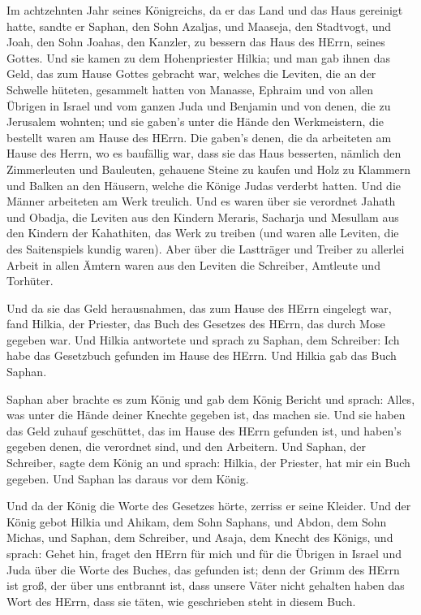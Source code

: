  Im achtzehnten Jahr seines Königreichs, da er das Land und
das Haus gereinigt hatte, sandte er Saphan, den Sohn Azaljas, und
Maaseja, den Stadtvogt, und Joah, den Sohn Joahas, den Kanzler, zu
bessern das Haus des HErrn, seines Gottes.  Und sie kamen zu
dem Hohenpriester Hilkia; und man gab ihnen das Geld, das zum Hause
Gottes gebracht war, welches die Leviten, die an der Schwelle hüteten,
gesammelt hatten von Manasse, Ephraim und von allen Übrigen in Israel
und vom ganzen Juda und Benjamin und von denen, die zu Jerusalem
wohnten;  und sie gaben's unter die Hände den Werkmeistern,
die bestellt waren am Hause des HErrn. Die gaben's denen, die da
arbeiteten am Hause des Herrn, wo es baufällig war, dass sie das Haus
besserten,  nämlich den Zimmerleuten und Bauleuten,
gehauene Steine zu kaufen und Holz zu Klammern und Balken an den
Häusern, welche die Könige Judas verderbt hatten.  Und die
Männer arbeiteten am Werk treulich. Und es waren über sie verordnet
Jahath und Obadja, die Leviten aus den Kindern Meraris, Sacharja und
Mesullam aus den Kindern der Kahathiten, das Werk zu treiben (und waren
alle Leviten, die des Saitenspiels kundig waren).  Aber
über die Lastträger und Treiber zu allerlei Arbeit in allen Ämtern waren
aus den Leviten die Schreiber, Amtleute und Torhüter.

 Und da sie das Geld herausnahmen, das zum Hause des HErrn
eingelegt war, fand Hilkia, der Priester, das Buch des Gesetzes des
HErrn, das durch Mose gegeben war.  Und Hilkia antwortete
und sprach zu Saphan, dem Schreiber: Ich habe das Gesetzbuch gefunden im
Hause des HErrn. Und Hilkia gab das Buch Saphan.

 Saphan aber brachte es zum König und gab dem König Bericht
und sprach: Alles, was unter die Hände deiner Knechte gegeben ist, das
machen sie.  Und sie haben das Geld zuhauf geschüttet, das
im Hause des HErrn gefunden ist, und haben's gegeben denen, die
verordnet sind, und den Arbeitern.  Und Saphan, der
Schreiber, sagte dem König an und sprach: Hilkia, der Priester, hat mir
ein Buch gegeben. Und Saphan las daraus vor dem König.

 Und da der König die Worte des Gesetzes hörte, zerriss er
seine Kleider.  Und der König gebot Hilkia und Ahikam, dem
Sohn Saphans, und Abdon, dem Sohn Michas, und Saphan, dem Schreiber, und
Asaja, dem Knecht des Königs, und sprach:  Gehet hin,
fraget den HErrn für mich und für die Übrigen in Israel und Juda über
die Worte des Buches, das gefunden ist; denn der Grimm des HErrn ist
groß, der über uns entbrannt ist, dass unsere Väter nicht gehalten haben
das Wort des HErrn, dass sie täten, wie geschrieben steht in diesem
Buch.

